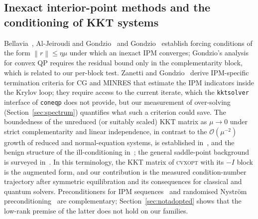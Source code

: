 \documentclass[11pt]{article}
\theoremstyle{definition}
\newcommand{\norm}[1]{\left\lVert #1 \right\rVert}
\newcommand{\bigO}{\mathcal{O}}
\begin{document}
\subsection{Inexact interior-point methods and the conditioning of KKT systems}
Bellavia~\cite{bellavia1998inexact}, Al-Jeiroudi and Gondzio~\cite{aljeiroudi2009convergence} and Gondzio~\cite{gondzio2013convergence} establish forcing conditions of the form $\norm{r}\le\eta\mu$ under which an inexact IPM converges; Gondzio's analysis for convex QP requires the residual bound only in the complementarity block, which is related to our per-block test. Zanetti and Gondzio~\cite{zanetti2023stopping} derive IPM-specific termination criteria for CG and MINRES that estimate the IPM indicators inside the Krylov loop; they require access to the current iterate, which the \texttt{kktsolver} interface of \texttt{coneqp} does not provide, but our measurement of over-solving (Section~\ref{sec:spectrum}) quantifies what such a criterion could save. The boundedness of the unreduced (or suitably scaled) KKT matrix as $\mu\to0$ under strict complementarity and linear independence, in contrast to the $\bigO(\mu^{-2})$ growth of reduced and normal-equation systems, is established in~\cite{greif2014bounds,morini2016spectral}, and the benign structure of the ill-conditioning in~\cite{wright1998illconditioning,forsgren1996conditioning}; the general saddle-point background is surveyed in~\cite{benzi2005saddle}. In this terminology, the KKT matrix of \textsc{cvxopt} with its $-I$ block is the augmented form, and our contribution is the measured condition-number trajectory after symmetric equilibration and its consequences for classical and quantum solvers. Preconditioners for IPM sequences~\cite{bergamaschi2004preconditioning,gondzio2022generalpurpose,bellavia2015updating,pougkakiotis2021ippmm} and randomised Nystr\"om preconditioning~\cite{frangella2023nystrom,chu2026nystrom} are complementary; Section~\ref{sec:notadopted} shows that the low-rank premise of the latter does not hold on our families.
\end{document}
